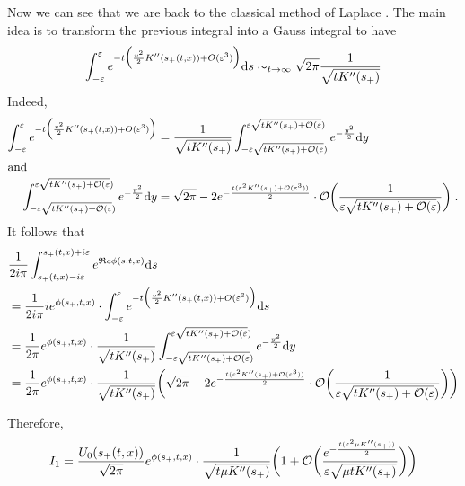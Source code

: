 \documentclass[11pt]{amsart}
\renewcommand{\Re}{\mathfrak{R}e}
\begin{document}
Now we can see that we are back to the classical method of Laplace \cite{laplace1986memoir}. The main idea is to transform the previous integral into a Gauss integral to have
    \begin{equation}
    \int_{- \varepsilon}^{\varepsilon} e^{- t \Big(\frac{v^2}{2} K''(s_+(t,x)) + O(\varepsilon^3)\Big)} \mathrm ds 
    \sim_{t \to \infty}
    \sqrt{2\pi} \frac{1}{\sqrt{tK''(s_+)}}
    \end{equation}
Indeed, 
\begin{align*}
    \int_{- \varepsilon}^{\varepsilon} e^{- t \Big(\frac{v^2}{2} K''(s_+(t,x)) + O(\varepsilon^3)\Big)} 
    &= 
     \frac{1}{\sqrt{tK''(s_+)}} \int_{- \varepsilon \sqrt{tK''(s_+) + \mathcal{O}(\varepsilon})}^{\varepsilon \sqrt{tK''(s_+) + \mathcal{O}(\varepsilon})} e^{- \frac{y^2}{2}}\mathrm dy \\
     \intertext{and}
     \int_{- \varepsilon \sqrt{tK''(s_+) + \mathcal{O}(\varepsilon})}^{\varepsilon \sqrt{tK''(s_+) + \mathcal{O}(\varepsilon})} e^{- \frac{y^2}{2}}\mathrm dy &= 
    \sqrt{2\pi} - 2 e^{-\frac{t(\varepsilon^2 K''(s_+) + \mathcal{O}(\varepsilon^3))}{2}} \cdot \mathcal{O}\bigg(\frac{1 }{\varepsilon \sqrt{tK''(s_+) + \mathcal{O}(\varepsilon})}\bigg)
    \; .
\end{align*}
It follows that 
    \begin{align*}
     &\frac{1}{2i\pi}   \int_{s_+(t,x) - i\varepsilon}^{s_+(t,x) + i\varepsilon} e^{\Re \phi(s,t,x)} \ds \\
     &= 
     \frac{1}{2i\pi} i e^{\phi(s_+, t, x)} \cdot \int_{- \varepsilon}^{\varepsilon} e^{- t \Big(\frac{v^2}{2} K''(s_+(t,x)) + O(\varepsilon^3)\Big)} \ds  \\
     &= 
      \frac{1}{2\pi} e^{\phi(s_+, t, x)} \cdot \frac{1}{\sqrt{tK''(s_+)}} \int_{- \varepsilon \sqrt{tK''(s_+) + \Ocal(\varepsilon})}^{\varepsilon \sqrt{tK''(s_+) + \Ocal(\varepsilon})} e^{- \frac{y^2}{2}}\dy \\
     &=
    \frac{1}{2\pi} e^{\phi(s_+, t, x)} \cdot \frac{1}{\sqrt{tK''(s_+)}} \bigg( 
    \sqrt{2\pi} - 2 e^{-\frac{t(\varepsilon^2 K''(s_+) + \Ocal(\varepsilon^3))}{2}} \cdot \Ocal\bigg(\frac{1 }{\varepsilon \sqrt{tK''(s_+) + \Ocal(\varepsilon})}\bigg) \bigg) \\
    \end{align*}
    
Therefore, 
    \begin{equation}
    I_1 = \frac{U_0(s_+(t,x))}{\sqrt{2\pi}} e^{\phi(s_+, t, x)} \cdot \frac{1}{\sqrt{t \mu K''(s_+)}} \bigg( 
    1 + \mathcal{O}\bigg(\frac{e^{-\frac{t(\varepsilon^2 \mu K''(s_+))}{2}} }{\varepsilon \sqrt{\mu tK''(s_+)}}\bigg) \bigg)\\
    \end{equation}
\end{document}
